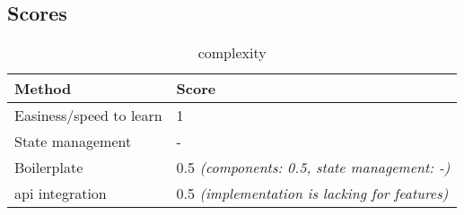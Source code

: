 \subsection{Scores}
\label{subsec:hilla:scores}

\begin{table}[H]
    \centering
    \begin{tabular}{|l|l|}
        \hline
        \textbf{Method}            & \textbf{Score}                                        \\
        \hline
        Easiness/speed to learn    & 1                                                     \\ \hline
        State management           & -                                                     \\ \hline
        Boilerplate                & 0.5 \textit{(components: 0.5, state management: -)}   \\ \hline
        \acrshort{api} integration & 0.5 \textit{(implementation is lacking for features)} \\ \hline
    \end{tabular}
    \caption{complexity}
    \label{tab:hilla:complexity}
\end{table}

